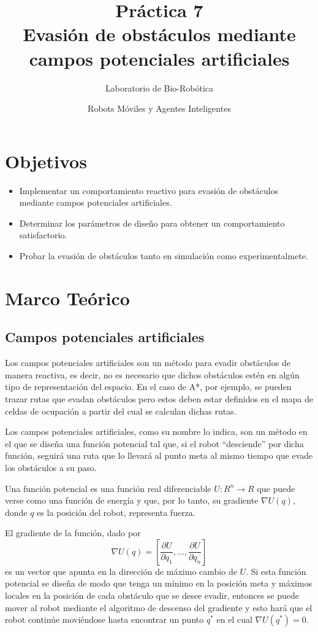 \documentclass[letterpaper,12pt]{article}
\title{Práctica 7  \\ Evasión de obstáculos mediante campos potenciales artificiales}
\author{Laboratorio de Bio-Robótica}
\date{Robots Móviles y Agentes Inteligentes}
\begin{document}
\renewcommand{\tablename}{Tabla}
\maketitle
\section*{Objetivos}
\begin{itemize}
\item Implementar un comportamiento reactivo para evasión de obstáculos mediante campos potenciales artificiales.
\item Determinar los parámetros de diseño para obtener un comportamiento satisfactorio.
\item Probar la evasión de obstáculos tanto en simulación como experimentalmete.
\end{itemize}

\section{Marco Teórico}
\subsection{Campos potenciales artificiales}
Los campos potenciales artificiales son un método para evadir obstáculos de manera reactiva, es decir, no es necesario que dichos obstáculos estén en algún tipo de representación del espacio. En el caso de A*, por ejemplo, se pueden trazar rutas que evadan obstáculos pero estos deben estar definidos en el mapa de celdas de ocupación a partir del cual se calculan dichas rutas.

Los campos potenciales artificiales, como su nombre lo indica, son un método en el que se diseña una función potencial tal que, si el robot ``desciende'' por dicha función, seguirá una ruta que lo llevará al punto meta al mismo tiempo que evade los obstáculos a su paso.

Una función potencial es una función real diferenciable $U: R^n \rightarrow R$ que puede verse como una función de energía y que, por lo tanto, su gradiente $\nabla U(q)$, donde $q$ es la posición del robot, representa fuerza. 

El gradiente de la función, dado por
\begin{equation}
  \label{eq:PotentialGradient}
  \nabla U(q) = \left[\frac{\partial U}{\partial q_1},\dots,\frac{\partial U}{\partial q_n}\right]
\end{equation}
es un vector que apunta en la dirección de máximo cambio de $U$. Si esta función potencial se diseña de modo que tenga un mínimo en la posición meta y máximos locales en la posición de cada obstáculo que se desee evadir, entonces se puede mover al robot mediante el algoritmo de descenso del gradiente y esto hará que el robot continúe moviéndose hasta encontrar un punto $q^*$ en el cual $\nabla U(q^*) = 0$.
\end{document}

